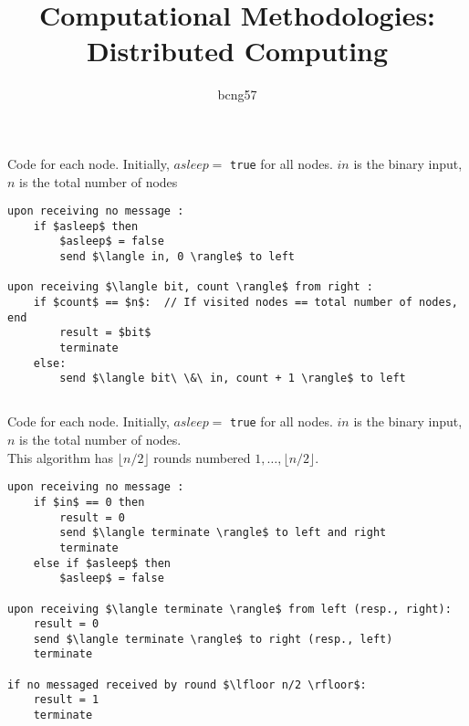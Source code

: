 \documentclass[11pt]{article}
\title{\vspace{-2.5cm}Computational Methodologies: Distributed Computing}
\author{bcng57}
\date{}
\begin{document}
\maketitle

\section{}

\subsection{}

Code for each node. Initially, $asleep =$ \texttt{true} for all nodes. $in$ is the binary input, $n$ is the total number of nodes

\begin{lstlisting}
upon receiving no message :
	if $asleep$ then
		$asleep$ = false
		send $\langle in, 0 \rangle$ to left

upon receiving $\langle bit, count \rangle$ from right :
	if $count$ == $n$:  // If visited nodes == total number of nodes, end
		result = $bit$
		terminate
	else:
		send $\langle bit\ \&\ in, count + 1 \rangle$ to left

\end{lstlisting}


\subsection{}

Code for each node. Initially, $asleep =$ \texttt{true} for all nodes. $in$ is the binary input, $n$ is the total number of nodes.\\
This algorithm has $\lfloor n/2 \rfloor$ rounds numbered $1,\dots,\lfloor n/2 \rfloor$.

\begin{lstlisting}
upon receiving no message :
	if $in$ == 0 then
		result = 0
		send $\langle terminate \rangle$ to left and right
		terminate
	else if $asleep$ then
		$asleep$ = false

upon receiving $\langle terminate \rangle$ from left (resp., right):
	result = 0
	send $\langle terminate \rangle$ to right (resp., left)
	terminate
	
if no messaged received by round $\lfloor n/2 \rfloor$:
	result = 1
	terminate

\end{lstlisting}
\end{document}
